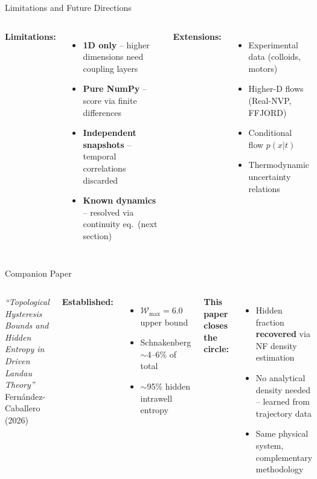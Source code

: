 \documentclass[aspectratio=169,11pt]{beamer}
\newcommand{\emphbox}[1]{\colorbox{blue!8}{\parbox{0.92\textwidth}{#1}}}
\begin{document}
\begin{frame}{Limitations and Future Directions}

\begin{columns}[T]
\textbf{Limitations:}
\begin{itemize}
    \item \textbf{1D only} -- higher dimensions need coupling layers
    \item \textbf{Pure NumPy} -- score via finite differences
    \item \textbf{Independent snapshots} -- temporal correlations discarded
    \item \textbf{Known dynamics} -- \textcolor{successgreen}{resolved} via continuity eq.\ (next section)
\end{itemize}

\textbf{Extensions:}
\begin{itemize}
    \item Experimental data (colloids, motors)
    \item Higher-D flows (Real-NVP, FFJORD)
    \item Conditional flow $p(x|t)$
    \item Thermodynamic uncertainty relations
\end{itemize}
\end{columns}

\end{frame}


\begin{frame}{Companion Paper}

\begin{columns}[T]
\emphbox{
\textit{``Topological Hysteresis Bounds and Hidden Entropy in Driven Landau Theory''}\\[0.2em]
{\small Fern\'andez-Caballero (2026)}
}

\smallskip
\textbf{Established:}
\begin{itemize}
    \item $\mathcal{W}_{\max} = 6.0$ upper bound
    \item Schnakenberg $\sim$4--6\% of total
    \item $\sim$95\% hidden intrawell entropy
\end{itemize}

\vspace{1.5em}
\textbf{This paper closes the circle:}
\begin{itemize}
    \item Hidden fraction \textbf{recovered} via NF density estimation
    \item No analytical density needed -- learned from trajectory data
    \item Same physical system, complementary methodology
\end{itemize}
\end{columns}

\end{frame}
\end{document}
